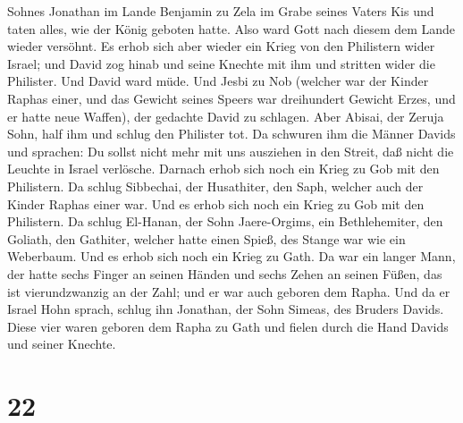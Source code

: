 Sohnes Jonathan im Lande Benjamin zu Zela im Grabe seines Vaters Kis und
taten alles, wie der König geboten hatte. Also ward Gott nach diesem dem
Lande wieder versöhnt.  Es erhob sich aber wieder ein Krieg
von den Philistern wider Israel; und David zog hinab und seine Knechte
mit ihm und stritten wider die Philister. Und David ward müde.
 Und Jesbi zu Nob (welcher war der Kinder Raphas einer, und
das Gewicht seines Speers war dreihundert Gewicht Erzes, und er hatte
neue Waffen), der gedachte David zu schlagen.  Aber Abisai,
der Zeruja Sohn, half ihm und schlug den Philister tot. Da schwuren ihm
die Männer Davids und sprachen: Du sollst nicht mehr mit uns ausziehen
in den Streit, daß nicht die Leuchte in Israel verlösche. 
Darnach erhob sich noch ein Krieg zu Gob mit den Philistern. Da schlug
Sibbechai, der Husathiter, den Saph, welcher auch der Kinder Raphas
einer war.  Und es erhob sich noch ein Krieg zu Gob mit den
Philistern. Da schlug El-Hanan, der Sohn Jaere-Orgims, ein
Bethlehemiter, den Goliath, den Gathiter, welcher hatte einen Spieß, des
Stange war wie ein Weberbaum.  Und es erhob sich noch ein
Krieg zu Gath. Da war ein langer Mann, der hatte sechs Finger an seinen
Händen und sechs Zehen an seinen Füßen, das ist vierundzwanzig an der
Zahl; und er war auch geboren dem Rapha.  Und da er Israel
Hohn sprach, schlug ihn Jonathan, der Sohn Simeas, des Bruders Davids.
 Diese vier waren geboren dem Rapha zu Gath und fielen
durch die Hand Davids und seiner Knechte.

\hypertarget{section-21}{%
\section{22}\label{section-21}}

